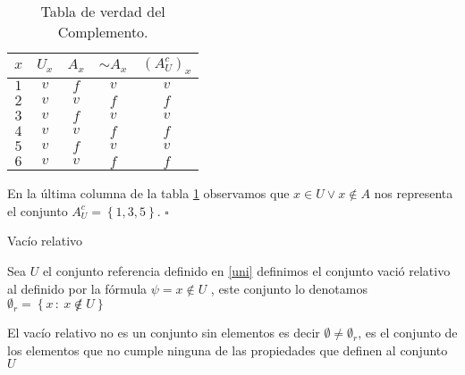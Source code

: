\begin{table}[H]
\centering

\caption{Tabla de verdad del Complemento.}

\setlength\arrayrulewidth{1pt} 

\begin{tabular}{cccc|c}
\arrayrulecolor{ptctitle}\hline\cellcolor{ptctitle!50}$x$ &
\cellcolor{ptctitle!50}$U_{x}$ &
\cellcolor{ptctitle!50}$A_{x}$ &
\cellcolor{ptctitle!50}$\sim A_{x}$ &
\cellcolor{ptctitle!50}$\left(A_{U}^{c}\right)_{x}$\tabularnewline
\hline\cellcolor{ptcbackground}$1$ &
\cellcolor{ptcbackground} $v$ &
\cellcolor{ptcbackground} $f$ &
\cellcolor{ptcbackground}$v$ &
\cellcolor{ptcbackground}$v$\tabularnewline
\hline\cellcolor{gray!50}$2$ &
\cellcolor{gray!50} $v$ &
\cellcolor{gray!50} $v$ &
\cellcolor{gray!50}$f$ &
\cellcolor{gray!50}$f$\tabularnewline
\hline\cellcolor{ptcbackground}$3$ &
\cellcolor{ptcbackground} $v$ &
\cellcolor{ptcbackground} $f$ &
\cellcolor{ptcbackground} $v$ &
\cellcolor{ptcbackground} $v$\tabularnewline
\hline\cellcolor{gray!50}$4$ &
\cellcolor{gray!50} $v$ &
\cellcolor{gray!50} $v$ &
\cellcolor{gray!50} $f$ &
\cellcolor{gray!50} $f$\tabularnewline
\hline\cellcolor{ptcbackground}$5$ &
\cellcolor{ptcbackground} $v$ &
\cellcolor{ptcbackground} $f$ &
\cellcolor{ptcbackground} $v$ &
\cellcolor{ptcbackground} $v$\tabularnewline
\hline\cellcolor{gray!50}$6$ &
\cellcolor{gray!50} $v$ &
\cellcolor{gray!50} $v$ &
\cellcolor{gray!50} $f$ &
\cellcolor{gray!50} $f$\tabularnewline
\end{tabular}

\label{tcon}
\end{table}

En la última columna de la tabla \ref{tcon} observamos que $x\in U\vee x\notin A$
nos representa el conjunto $A_{U}^{c}=\left\{ 1,3,5\right\} $. \hfill$\square$

\begin{defi}{Vacío relativo}{}

Sea $U$ el conjunto referencia definido en \ref{uni}  definimos
el conjunto vació relativo al definido por la fórmula $\psi=x\notin U$
, este conjunto lo denotamos $\emptyset_{r}=\left\{ x\,:\:x\not\notin U\right\} $

\end{defi}

\obs El vacío relativo no es un conjunto sin elementos es decir $\emptyset\neq\emptyset_{r}$,
es el conjunto de los elementos que no cumple ninguna de las propiedades
que definen al conjunto $U$ 

